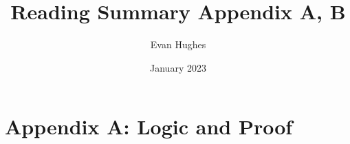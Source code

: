 \documentclass{article}
\title{Reading Summary Appendix A, B}
\author{Evan Hughes}
\date{January 2023}
\begin{document}
\maketitle
\section{Appendix A: Logic and Proof}
\end{document}

